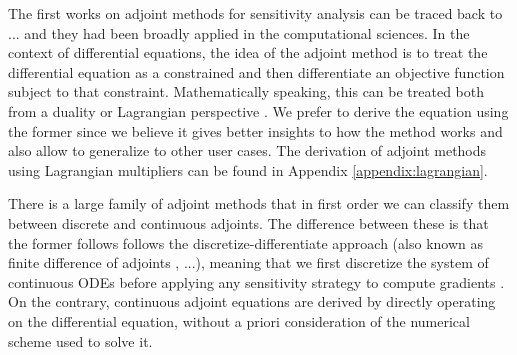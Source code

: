The first works on adjoint methods for sensitivity analysis can be traced back to ... and they had been broadly applied in the computational sciences. 
In the context of differential equations, the idea of the adjoint method is to treat the differential equation as a constrained and then differentiate an objective function subject to that constraint. 
Mathematically speaking, this can be treated both from a duality or Lagrangian perspective \cite{Giles_Pierce_2000}.
We prefer to derive the equation using the former since we believe it gives better insights to how the method works and also allow to generalize to other user cases. 
The derivation of adjoint methods using Lagrangian multipliers can be found in Appendix \ref{appendix:lagrangian}.

There is a large family of adjoint methods that in first order we can classify them between discrete and continuous adjoints. 
The difference between these is that the former follows follows the discretize-differentiate approach (also known as finite difference of adjoints \cite{Sirkes_Tziperman_1997}, ...), meaning that we first discretize the system of continuous ODEs before applying any sensitivity strategy to compute gradients \cite{Giles_Pierce_2000, allaire2015review}. 
On the contrary, continuous adjoint equations are derived by directly operating on the differential equation, without a priori consideration of the numerical scheme used to solve it. 